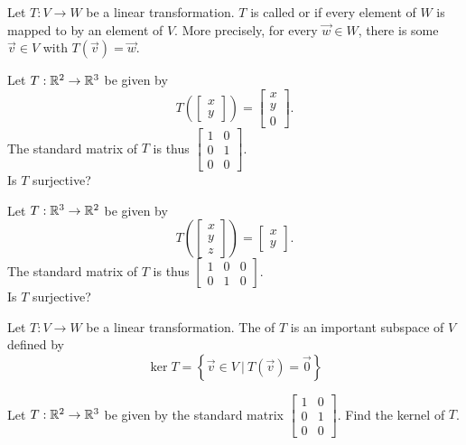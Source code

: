 \begin{applicationActivities}{2}{18}
\begin{definition}
Let $T: V \rightarrow W$ be a linear transformation.
$T$ is called  or  if every element of $W$ is mapped to by an element of $V$.  More precisely, for every $\vec{w} \in W$, there is some $\vec{v} \in V$ with $T(\vec{v})=\vec{w}$.
\end{definition}

\begin{activity}{5}
Let $T: \mathbb{R}^2 \rightarrow \mathbb{R}^3$ be given by $$T\left(\begin{bmatrix}x \\ y \end{bmatrix} \right) = \begin{bmatrix} x \\ y \\ 0 \end{bmatrix}.$$
The standard matrix of $T$ is thus $\begin{bmatrix} 1 & 0 \\ 0 & 1 \\ 0 & 0 \end{bmatrix}$. \\
Is $T$ surjective?
\end{activity}

\begin{activity}{5}
Let $T: \mathbb{R}^3 \rightarrow \mathbb{R}^2$ be given by $$T\left(\begin{bmatrix} x \\ y \\ z \end{bmatrix} \right) = \begin{bmatrix} x \\ y \end{bmatrix}.$$  The standard matrix of $T$ is thus $\begin{bmatrix} 1 & 0 &0  \\ 0 & 1 & 0 \end{bmatrix}$.\\
Is $T$ surjective?
\end{activity}


\begin{definition}
Let $T: V \rightarrow W$ be a linear transformation.  The  of $T$
is an important subspace of \(V\) defined by
\[
\ker T = \left\{ \vec{v} \in V\ \big|\ T(\vec{v})=\vec{0}\right\}
\]
\end{definition}

\begin{activity}{5}
Let $T: \mathbb{R}^2 \rightarrow \mathbb{R}^3$ be given by the standard matrix $\begin{bmatrix} 1 & 0 \\ 0 & 1 \\ 0 & 0 \end{bmatrix}$.  Find the kernel of $T$.
\end{activity}


\end{applicationActivities}
